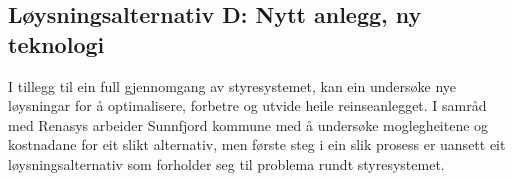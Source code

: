 \newpage
\subsection{Løysningsalternativ D: Nytt anlegg, ny teknologi}
I tillegg til ein full gjennomgang av styresystemet, 
kan ein undersøke nye løysningar for å optimalisere, forbetre og utvide heile reinseanlegget.
I samråd med Renasys arbeider Sunnfjord kommune med å undersøke moglegheitene og kostnadane for eit slikt alternativ,
men første steg i ein slik prosess er uansett eit løysningsalternativ som forholder seg til problema rundt styresystemet.


